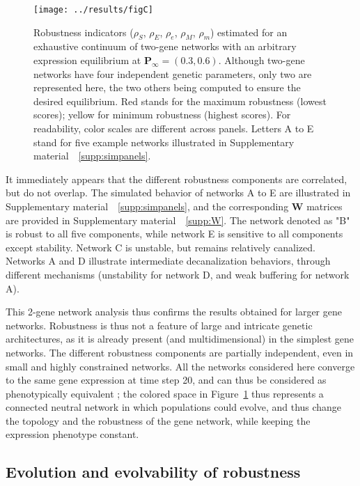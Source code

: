 \documentclass[10pt,a4paper]{article}
\newcommand{\stability}{{\rho_S}}
\newcommand{\earlyenv}{{\rho_E}}
\newcommand{\lateenv}{{\rho_e}}
\newcommand{\earlymut}{{\rho_M}}
\newcommand{\latemut}{{\rho_m}}
\newcommand{\SupMat}{Supplementary material~}
\begin{document}
\begin{figure}[t]
\begin{adjustwidth}{-1in}{0in}
\begin{flushright}
\texttt{[image: ../results/figC]}
\caption{\color{Gray} \label{fig:imgpanels} Robustness indicators ($\stability$, $\earlyenv$, $\lateenv$, $\earlymut$, $\latemut$) estimated for an exhaustive continuum of two-gene networks with an arbitrary expression equilibrium at $\bm P_\infty = (0.3, 0.6)$. Although two-gene networks have four independent genetic parameters, only two are represented here, the two others being computed to ensure the desired equilibrium. Red stands for the maximum robustness (lowest scores); yellow for minimum robustness (highest scores). For readability, color scales are different across panels. Letters A to E stand for five example networks illustrated in \SupMat~\ref{supp:simpanels}.}
\end{flushright}\end{adjustwidth}
\end{figure}

It immediately appears that the different robustness components are correlated, but do not overlap. The simulated behavior of networks A to E are illustrated in \SupMat~\ref{supp:simpanels}, and the corresponding $\bm W$ matrices are provided in \SupMat~\ref{supp:W}. The network denoted as "B" is robust to all five components, while network E is sensitive to all components except stability. Network C is unstable, but remains relatively canalized. Networks A and D illustrate intermediate decanalization behaviors, through different mechanisms (unstability for network D, and weak buffering for network A). 

This 2-gene network analysis thus confirms the results obtained for larger gene networks. Robustness is thus not a feature of large and intricate genetic architectures, as it is already present (and multidimensional) in the simplest gene networks. The different robustness components are partially independent, even in small and highly constrained networks. All the networks considered here converge to the same gene expression at time step 20, and can thus be considered as phenotypically equivalent ; the colored space in Figure~\ref{fig:imgpanels} thus represents a connected neutral network in which populations could evolve, and thus change the topology and the robustness of the gene network, while keeping the expression phenotype constant. 

\subsection{Evolution and evolvability of robustness}
\end{document}
